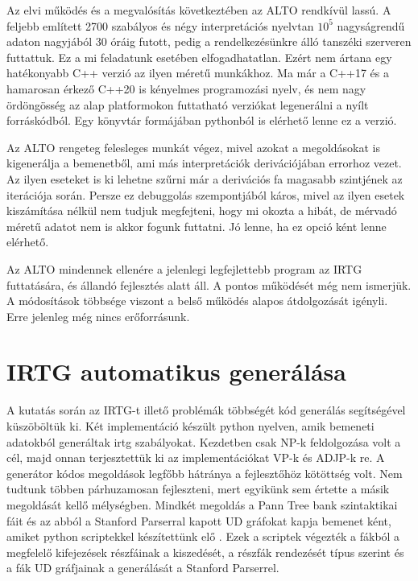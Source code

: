 Az elvi működés és a megvalósítás következtében az ALTO rendkívül lassú. A feljebb említett 2700 szabályos és négy interpretációs nyelvtan $10^5$ nagyságrendű adaton nagyjából 30 óráig futott, pedig a rendelkezésünkre álló tanszéki szerveren futtattuk. Ez a mi feladatunk esetében elfogadhatatlan. Ezért nem ártana egy hatékonyabb C++ verzió az ilyen méretű munkákhoz. Ma már a C++17 és a hamarosan érkező C++20 is kényelmes programozási nyelv, és nem nagy ördöngösség az alap platformokon futtatható verziókat legenerálni a nyílt forráskódból. Egy könyvtár formájában pythonból is elérhető lenne ez a verzió.

Az ALTO rengeteg felesleges munkát végez, mivel azokat a megoldásokat is kigenerálja a bemenetből, ami más interpretációk derivációjában errorhoz vezet. Az ilyen eseteket is ki lehetne szűrni már a derivációs fa magasabb szintjének az iterációja során. Persze ez debuggolás szempontjából káros, mivel az ilyen esetek kiszámítása nélkül nem tudjuk megfejteni, hogy mi okozta a hibát, de mérvadó méretű adatot nem is akkor fogunk futtatni. Jó lenne, ha ez opció ként lenne elérhető.

Az ALTO mindennek ellenére a jelenlegi legfejlettebb program az IRTG futtatására, és állandó fejlesztés alatt áll. A pontos működését még nem ismerjük. A módosítások többsége viszont a belső működés alapos átdolgozását igényli. Erre jelenleg még nincs erőforrásunk.

\section{IRTG automatikus generálása}
\label{sec:solutions}
A kutatás során az IRTG-t illető problémák többségét kód generálás segítségével küszöböltük ki. 
Két implementáció készült python nyelven, amik bemeneti adatokból generáltak irtg szabályokat. 
Kezdetben csak NP-k feldolgozása volt a cél, majd onnan terjesztettük ki az implementációkat VP-k és ADJP-k re. 
A generátor kódos megoldások legfőbb hátránya a fejlesztőhöz kötöttség volt. 
Nem tudtunk többen párhuzamosan fejleszteni, mert egyikünk sem értette a másik megoldását kellő mélységben.
Mindkét megoldás a Pann Tree bank szintaktikai fáit és az abból a Stanford Parserral kapott UD gráfokat kapja bemenet ként, amiket python scriptekkel készítettünk elő . 
Ezek a scriptek végezték a fákból a megfelelő kifejezések részfáinak a kiszedését, a részfák rendezését típus szerint és a fák UD gráfjainak a generálását a Stanford Parserrel.

